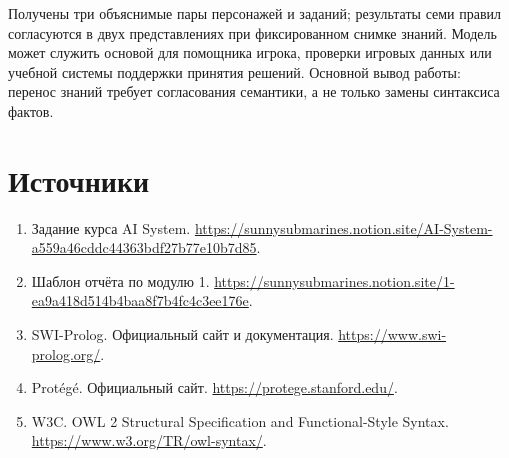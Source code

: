 Получены три объяснимые пары персонажей и заданий; результаты семи правил согласуются в двух представлениях при фиксированном снимке знаний. Модель может служить основой для помощника игрока, проверки игровых данных или учебной системы поддержки принятия решений. Основной вывод работы: перенос знаний требует согласования семантики, а не только замены синтаксиса фактов.

\section*{Источники}
\begin{enumerate}
\item Задание курса AI System. \url{https://sunnysubmarines.notion.site/AI-System-a559a46cddc44363bdf27b77e10b7d85}.
\item Шаблон отчёта по модулю 1. \url{https://sunnysubmarines.notion.site/1-ea9a418d514b4baa8f7b4fc4c3ee176e}.
\item SWI-Prolog. Официальный сайт и документация. \url{https://www.swi-prolog.org/}.
\item Protégé. Официальный сайт. \url{https://protege.stanford.edu/}.
\item W3C. OWL 2 Structural Specification and Functional-Style Syntax. \url{https://www.w3.org/TR/owl-syntax/}.
\end{enumerate}

\appendix
